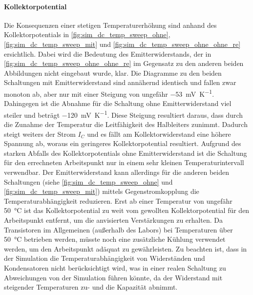 \documentclass[12pt,english,ngerman]{scrartcl}
\begin{document}
\paragraph{Kollektorpotential}
Die Konsequenzen einer stetigen Temperaturerhöhung sind anhand des Kollektorpotentials in
\autoref{fig:sim_dc_temp_sweep_ohne}, \autoref{fig:sim_dc_temp_sweep_mit} und \autoref{fig:sim_dc_temp_sweep_ohne_ohne_re}
ersichtlich. Dabei wird die Bedeutung des Emitterwiderstands, der in \autoref{fig:sim_dc_temp_sweep_ohne_ohne_re}
im Gegensatz zu den anderen beiden Abbildungen nicht eingebaut wurde, klar. Die Diagramme zu den beiden Schaltungen mit 
Emitterwiderstand sind annähernd identisch und fallen zwar monoton ab, aber nur mit einer Steigung von ungefähr \SI{-53}{\milli\volt\per\kelvin}. Dahingegen 
ist die Abnahme für die Schaltung ohne Emitterwiderstand viel steiler und beträgt \SI{-120}{\milli\volt\per\kelvin}. Diese Steigung resultiert daraus, dass 
durch die Zunahme der Temperatur die Leitfähigkeit des Halbleiters zunimmt. Dadurch steigt weiters der Strom $I_C$ und es fällt am Kollektorwiderstand eine höhere
Spannung ab, woraus ein geringeres Kollektorpotential resultiert. Aufgrund des starken Abfalls des Kollektorpotentials ohne Emitterwiderstand ist die Schaltung
für den errechneten Arbeitspunkt nur in einem sehr kleinen Temperaturintervall verwendbar. Der Emitterwiderstand  kann allerdings für die anderen beiden Schaltungen
(siehe \autoref{fig:sim_dc_temp_sweep_ohne} und \autoref{fig:sim_dc_temp_sweep_mit}) mittels Gegenstromkopplung die Temperaturabhängigkeit reduzieren. Erst ab einer Temperatur
von ungefähr \SI{50}{\celsius} ist das Kollektorpotential zu weit vom gewollten Kollektorpotential für den Arbeitspunkt entfernt, um die anvisierten Verstärkungen zu
erhalten. Da Transistoren im Allgemeinen (außerhalb des Labors) bei Temperaturen über \SI{50}{\celsius} betrieben werden, müsste noch eine zusätzliche
Kühlung verwendet werden, um den Arbeitspunkt adäquat zu gewährleisten.
\newline
Zu beachten ist, dass in der Simulation die Temperaturabhängigkeit von Widerständen und Kondensatoren nicht berücksichtigt wird, was in einer realen Schaltung
zu Abweichungen von der Simulation führen könnte, da der Widerstand mit steigender Temperaturen zu- und die Kapazität abnimmt.

\end{document}
